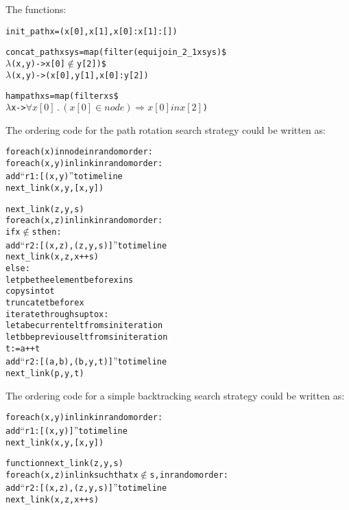 The functions:
\begin{alltt}
init_path x = (x[0], x[1], x[0]:x[1]:[])

concat_path xs ys = map (filter (equijoin_2_1 xs ys) \$
    \(\lambda\)(x,y) -> x[0] \(\not\in\) y[2]) \$
        \(\lambda\)(x,y) -> (x[0], y[1], x[0]:y[2])

hampath xs = map (filter xs \$
    \(\lambda\)x -> \(\forall x[0] \, . \, (x[0] \in node) \Rightarrow x[0] in x[2]\))
\end{alltt}


The ordering code for the path rotation search strategy could be written as:

\begin{alltt}
for each (x) in node in random order:
   for each (x,y) in link in random order:
      add ``r1:[(x,y)'' to timeline
      next_link(x,y,[x,y])

next_link(z,y,s)
   for each (x,z) in link in random order:
      if x \(\not\in\) s then:
         add ``r2: [(x,z), (z,y,s)]'' to timeline
         next_link(x,z,x++s)
      else:
         let p be the element before x in s
         copy s into t
         truncate t before x
         iterate through s up to x:
            let a be current elt from s in iteration
            let b be previous elt from s in iteration
            t := a ++ t
            add ``r2: [(a,b), (b,y,t)]'' to timeline
         next_link(p,y,t)
\end{alltt}

The ordering code for a simple backtracking search strategy could be written as:

\begin{alltt}
for each (x,y) in link in random order:
   add ``r1: [(x,y)]'' to timeline
   next_link(x,y,[x,y])

function next_link(z,y,s)
   for each (x,z) in link such that x \(\not\in\) s, in random order:
      add ``r2: [(x,z), (z,y,s)]'' to timeline
      next_link(x,z,x ++ s)
\end{alltt}

